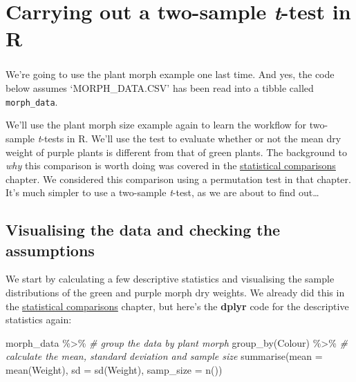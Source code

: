 \documentclass[
]{book}
\newenvironment{Shaded}{\begin{snugshade}}{\end{snugshade}}
\newcommand{\AttributeTok}[1]{\textcolor[rgb]{0.77,0.63,0.00}{#1}}
\newcommand{\CommentTok}[1]{\textcolor[rgb]{0.56,0.35,0.01}{\textit{#1}}}
\newcommand{\FunctionTok}[1]{\textcolor[rgb]{0.00,0.00,0.00}{#1}}
\newcommand{\NormalTok}[1]{#1}
\newcommand{\SpecialCharTok}[1]{\textcolor[rgb]{0.00,0.00,0.00}{#1}}
\newenvironment{greybox}{
  \definecolor{shadecolor}{rgb}{0.95,0.95,0.95}  %
  \color{black}
  \begin{shaded}}
 {\end{shaded}}
\newenvironment{infobox}[1]
  {
  \begin{itemize}
  \renewcommand{\labelitemi}{
    \raisebox{-.7\height}[0pt][0pt]{
      {\setkeys{Gin}{width=3em,keepaspectratio}
        \texttt{[image: images/\#1]}}
    }
  }
  \setlength{\fboxsep}{1em}
  \begin{greybox}
  \item
  }
  {
  \end{greybox}
  \end{itemize}
  }
\begin{document}
\hypertarget{carrying-out-a-two-sample-t-test-in-r}{%
\section{\texorpdfstring{Carrying out a two-sample \emph{t}-test in R}{Carrying out a two-sample t-test in R}}\label{carrying-out-a-two-sample-t-test-in-r}}

\begin{infobox}{action}

\hypertarget{section-4}{%
\subsubsection*{}\label{section-4}}

We're going to use the plant morph example one last time. And yes, the code below assumes `MORPH\_DATA.CSV' has been read into a tibble called \texttt{morph\_data}.

\end{infobox}

We'll use the plant morph size example again to learn the workflow for two-sample \emph{t}-tests in R. We'll use the test to evaluate whether or not the mean dry weight of purple plants is different from that of green plants. The background to \emph{why} this comparison is worth doing was covered in the \protect\hyperlink{statistical-comparisons}{statistical comparisons} chapter. We considered this comparison using a permutation test in that chapter. It's much simpler to use a two-sample \emph{t}-test, as we are about to find out\ldots{}

\hypertarget{visualising-the-data-and-checking-the-assumptions-1}{%
\subsection{Visualising the data and checking the assumptions}\label{visualising-the-data-and-checking-the-assumptions-1}}

We start by calculating a few descriptive statistics and visualising the sample distributions of the green and purple morph dry weights. We already did this in the \protect\hyperlink{statistical-comparisons}{statistical comparisons} chapter, but here's the \textbf{dplyr} code for the descriptive statistics again:

\begin{Shaded}
\begin{Highlighting}[]
\NormalTok{morph\_data }\SpecialCharTok{\%\textgreater{}\%} 
  \CommentTok{\# group the data by plant morph}
  \FunctionTok{group\_by}\NormalTok{(Colour) }\SpecialCharTok{\%\textgreater{}\%} 
  \CommentTok{\# calculate the mean, standard deviation and sample size}
  \FunctionTok{summarise}\NormalTok{(}\AttributeTok{mean =} \FunctionTok{mean}\NormalTok{(Weight), }
            \AttributeTok{sd =} \FunctionTok{sd}\NormalTok{(Weight),}
            \AttributeTok{samp\_size =} \FunctionTok{n}\NormalTok{())}
\end{Highlighting}
\end{Shaded}
\end{document}
